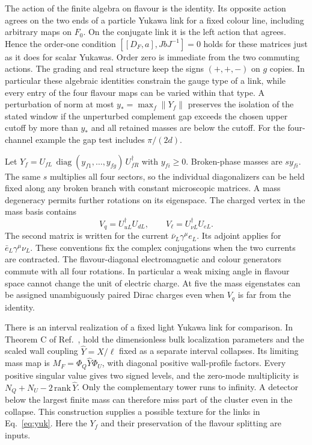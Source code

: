 \documentclass[aps,prd,reprint,onecolumn,nofootinbib,amsmath,amssymb]{revtex4-2}
\begin{document}
The action of the finite algebra on flavour is the identity. Its opposite action agrees on the two ends of a particle Yukawa link for a fixed colour line, including arbitrary maps on $F_0$. On the conjugate link it is the left action that agrees. Hence the order-one condition $[[D_F,a],JbJ^{-1}]=0$ holds for these matrices just as it does for scalar Yukawas. Order zero is immediate from the two commuting actions. The grading and real structure keep the signs $(+,+,-)$ on $g$ copies. In particular these algebraic identities constrain the gauge type of a link, while every entry of the four flavour maps can be varied within that type. A perturbation of norm at most $y_*=\max_f\|Y_f\|$ preserves the isolation of the stated window if the unperturbed complement gap exceeds the chosen upper cutoff by more than $y_*$ and all retained masses are below the cutoff. For the four-channel example the gap test includes $\pi/(2d)$.

Let $Y_f=U_{fL}\,\operatorname{diag}(y_{f1},\ldots,y_{fg})\,U_{fR}^\dagger$ with $y_{fi}\ge0$. Broken-phase masses are $s y_{fi}$. The same $s$ multiplies all four sectors, so the individual diagonalizers can be held fixed along any broken branch with constant microscopic matrices. A mass degeneracy permits further rotations on its eigenspace. The charged vertex in the mass basis contains
\begin{equation}
 V_q=U_{uL}^\dagger U_{dL},\qquad
 V_\ell=U_{\nu L}^\dagger U_{eL}.
 \label{eq:mix}
\end{equation}
The second matrix is written for the current $\bar\nu_L\gamma^\mu e_L$. Its adjoint applies for $\bar e_L\gamma^\mu\nu_L$. These conventions fix the complex conjugations when the two currents are contracted. The flavour-diagonal electromagnetic and colour generators commute with all four rotations. In particular a weak mixing angle in flavour space cannot change the unit of electric charge. At five the mass eigenstates can be assigned unambiguously paired Dirac charges even when $V_q$ is far from the identity.

There is an interval realization of a fixed light Yukawa link for comparison. In Theorem C of Ref.~\cite{towerlesspaper}, hold the dimensionless bulk localization parameters and the scaled wall coupling $\widehat Y=X/\ell$ fixed as a separate interval collapses. Its limiting mass map is $M_F=\Phi_Q\widehat Y\Phi_U$, with diagonal positive wall-profile factors. Every positive singular value gives two signed levels, and the zero-mode multiplicity is $N_Q+N_U-2\,\mathrm{rank}\,\widehat Y$. Only the complementary tower runs to infinity. A detector below the largest finite mass can therefore miss part of the cluster even in the collapse. This construction supplies a possible texture for the links in Eq.~\eqref{eq:yuk}. Here the $Y_f$ and their preservation of the flavour splitting are inputs.
\end{document}
